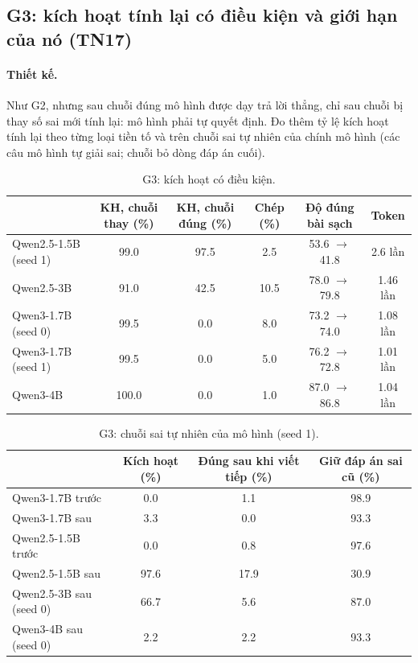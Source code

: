\documentclass[11pt]{article}
\begin{document}
\subsection{G3: kích hoạt tính lại có điều kiện và giới hạn của nó (TN17)}

\paragraph{Thiết kế.} Như G2, nhưng sau chuỗi đúng mô hình được dạy trả lời thẳng, chỉ sau chuỗi bị thay số
sai mới tính lại: mô hình phải tự quyết định. Đo thêm tỷ lệ kích hoạt tính lại theo từng loại tiền tố và trên
chuỗi sai tự nhiên của chính mô hình (các câu mô hình tự giải sai; chuỗi bỏ dòng đáp án cuối).

\begin{table}[h]
\centering\small
\caption{G3: kích hoạt có điều kiện.}
\begin{tabular}{lccccc}
\toprule
 & KH, chuỗi thay (\%) & KH, chuỗi đúng (\%) & Chép (\%) & Độ đúng bài sạch & Token \\
\midrule
Qwen2.5-1.5B (seed 1) & 99.0 & 97.5 & 2.5 & 53.6 $\to$ 41.8 & 2.6 lần \\
Qwen2.5-3B & 91.0 & 42.5 & 10.5 & 78.0 $\to$ 79.8 & 1.46 lần \\
Qwen3-1.7B (seed 0) & 99.5 & 0.0 & 8.0 & 73.2 $\to$ 74.0 & 1.08 lần \\
Qwen3-1.7B (seed 1) & 99.5 & 0.0 & 5.0 & 76.2 $\to$ 72.8 & 1.01 lần \\
Qwen3-4B & 100.0 & 0.0 & 1.0 & 87.0 $\to$ 86.8 & 1.04 lần \\
\bottomrule
\end{tabular}
\end{table}

\begin{table}[h]
\centering\small
\caption{G3: chuỗi sai tự nhiên của mô hình (seed 1).}
\begin{tabular}{lccc}
\toprule
 & Kích hoạt (\%) & Đúng sau khi viết tiếp (\%) & Giữ đáp án sai cũ (\%) \\
\midrule
Qwen3-1.7B trước & 0.0 & 1.1 & 98.9 \\
Qwen3-1.7B sau & 3.3 & 0.0 & 93.3 \\
Qwen2.5-1.5B trước & 0.0 & 0.8 & 97.6 \\
Qwen2.5-1.5B sau & 97.6 & 17.9 & 30.9 \\
Qwen2.5-3B sau (seed 0) & 66.7 & 5.6 & 87.0 \\
Qwen3-4B sau (seed 0) & 2.2 & 2.2 & 93.3 \\
\bottomrule
\end{tabular}
\end{table}
\end{document}
